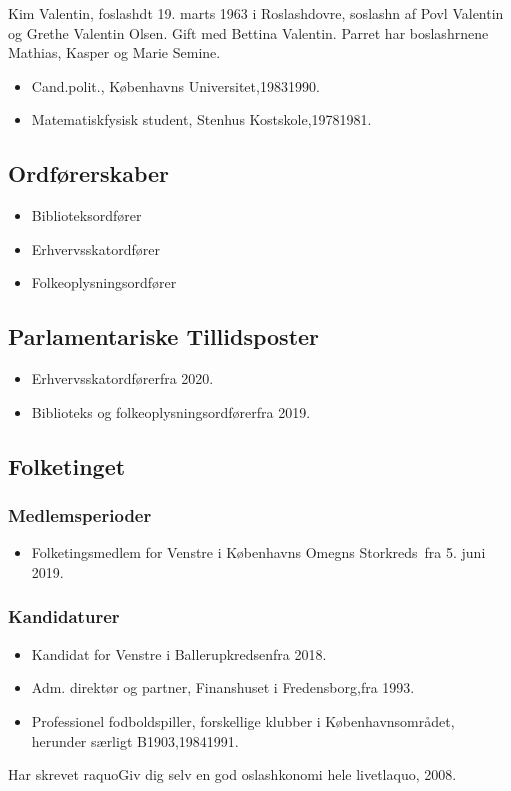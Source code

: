 \documentclass[11pt, a4paper]{awesome-cv}
\begin{document}
\makecvheader[R]
\makelettertitle
\begin{cvletter}
Kim Valentin, foslashdt 19. marts 1963 i Roslashdovre, soslashn af Povl Valentin og Grethe Valentin Olsen. Gift med Bettina Valentin. Parret har boslashrnene Mathias, Kasper og Marie Semine.

\begin{itemize}
\item Cand.polit., Københavns Universitet,19831990.
\item Matematiskfysisk student, Stenhus Kostskole,19781981.
\end{itemize}
\subsection*{Ordførerskaber}
\begin{itemize}
\item Biblioteksordfører
\item Erhvervsskatordfører
\item Folkeoplysningsordfører
\end{itemize}
\subsection*{Parlamentariske Tillidsposter}
\begin{itemize}
\item Erhvervsskatordførerfra 2020.
\item Biblioteks og folkeoplysningsordførerfra 2019.
\end{itemize}
\subsection*{Folketinget}
\subsubsection*{Medlemsperioder}
\begin{itemize}
\item Folketingsmedlem for Venstre i Københavns Omegns Storkreds fra 5. juni 2019.
\end{itemize}
\subsubsection*{Kandidaturer}
\begin{itemize}
\item Kandidat for Venstre i Ballerupkredsenfra 2018.
\end{itemize}
\begin{itemize}
\item Adm. direktør og partner, Finanshuset i Fredensborg,fra 1993.
\item Professionel fodboldspiller, forskellige klubber i Københavnsområdet, herunder særligt B1903,19841991.
\end{itemize}
Har skrevet raquoGiv dig selv en god oslashkonomi  hele livetlaquo, 2008.

\end{cvletter}
\end{document}
